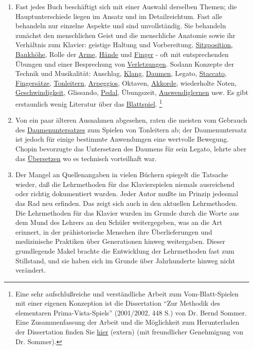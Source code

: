 \begin{enumerate}[label={\arabic*.}]
\item Fast jedes Buch beschäftigt sich mit einer Auswahl derselben Themen; die Hauptunterschiede liegen im Ansatz und im Detailreichtum.
Fast alle behandeln nur einzelne Aspekte und sind unvollständig.
Sie behandeln zunächst den menschlichen Geist und die menschliche Anatomie sowie ihr Verhältnis zum Klavier: geistige Haltung und Vorbereitung, \hyperref[c1ii3]{Sitzposition, Bankhöhe}, Rolle der \hyperref[c1ii10]{Arme}, \hyperref[c1iii4]{Hände} und \hyperref[c1iii4b]{Finger} - oft mit entsprechenden Übungen und einer Besprechung von \hyperref[c1iii10hand]{Verletzungen}.
Sodann Konzepte der Technik und Musikalität: Anschlag, \hyperref[c1iii1]{Klang}, \hyperref[c1iii5a]{Daumen}, Legato, \hyperref[c1iii1c]{Staccato}, \hyperref[c1ii18]{Fingersätze}, \hyperref[c1iii5a]{Tonleitern}, \hyperref[Arpeggios]{Arpeggios}, Oktaven, \hyperref[c1iii7e]{Akkorde}, wiederholte Noten, \hyperref[c1ii13]{Geschwindigkeit}, Glissando, \hyperref[c1ii23]{Pedal}, Übungszeit, \hyperref[c1iii6]{Auswendiglernen} usw.
Es gibt erstaunlich wenig Literatur über das \hyperref[c1iii11]{Blattspiel}.
\label{c030530}\footnote{Eine sehr aufschlußreiche und verständliche Arbeit zum Vom-Blatt-Spielen mit einer eigenen Konzeption ist die Dissertation \enquote{Zur Methodik des elementaren Prima-Vista-Spiels} (2001/2002, 448 S.) von Dr. Bernd Sommer.
Eine Zusammenfassung der Arbeit und die Möglichkeit zum Herunterladen der Dissertation finden Sie \hyperref[http://www.dissertation.de/buch.php3?buch=1405]{hier} (extern) (mit freundlicher Genehmigung von Dr. Sommer).}

\item Von ein paar älteren Ausnahmen abgesehen, raten die meisten vom Gebrauch des \hyperref[c1iii5a]{Daumenuntersatzes} zum Spielen von Tonleitern ab; der Daumenuntersatz ist jedoch für einige bestimmte Anwendungen eine wertvolle Bewegung.
Chopin bevorzugte das Untersetzen des Daumens für sein Legato, lehrte aber das \hyperref[c1iii5a2]{Übersetzen} wo es technisch vorteilhaft war.

\item Der Mangel an Quellenangaben in vielen Büchern spiegelt die Tatsache wieder, daß die Lehrmethoden für das Klavierspielen niemals ausreichend oder richtig dokumentiert wurden.
Jeder Autor mußte im Prinzip jedesmal das Rad neu erfinden.
Das zeigt sich auch in den aktuellen Lehrmethoden.
Die Lehrmethoden für das Klavier wurden im Grunde durch die Worte aus dem Mund des Lehrers an den Schüler weitergegeben, was an die Art erinnert, in der prähistorische Menschen ihre Überlieferungen und medizinische Praktiken über Generationen hinweg weitergaben.
Dieser grundlegende Makel brachte die Entwicklung der Lehrmethoden fast zum Stillstand, und sie haben sich im Grunde über Jahrhunderte hinweg nicht verändert.


\end{enumerate}
